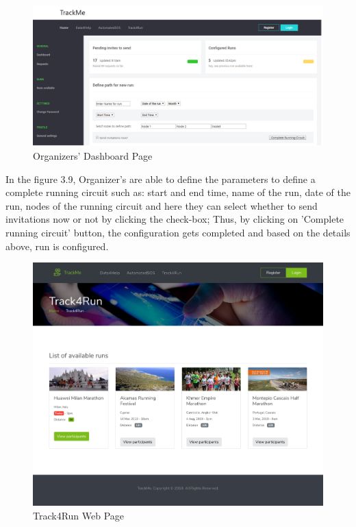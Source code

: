 \documentclass[a4paper, hidelinks, 12pt]{report}
\begin{document}
	\begin{figure}[H]
		\centering
		\includegraphics[scale=0.35]{UI/db_organizer2.png}
		\caption[UI: Organizers' Dashboard Page]{Organizers' Dashboard Page}
		\label{fig:Dashboard for Organizer}
	\end{figure}
	In the figure 3.9, Organizer's are able to define the parameters to define a complete running circuit such as: start and end time, name of the run, date of the run, nodes of the running circuit and here they can select whether to send invitations now or not by clicking the check-box; Thus, by clicking on 'Complete running circuit' button, the configuration gets completed and based on the details above, run is configured.
	
	\begin{figure}[H]
		\centering
		\includegraphics[scale=0.14]{UI/track4run.png}
		\caption[UI: Track4Run Web Page]{Track4Run Web Page}
		\label{fig:Track4Run Web Page}
	\end{figure}
	
\end{document}

